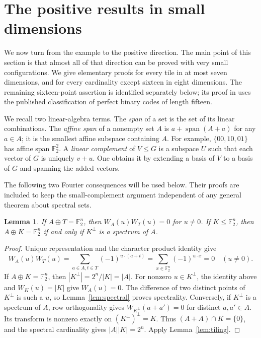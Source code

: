 \documentclass[11pt]{article}
\numberwithin{equation}{section}
\newtheorem{lemma}[theorem]{Lemma}
\theoremstyle{definition}
\theoremstyle{remark}\newtheorem{remark}[theorem]{Remark}
\newcommand{\F}{\mathbb F_2}
\newcommand{\spanof}{\operatorname{span}}
\begin{document}
\section{The positive results in small dimensions}
\label{sec:positive-elementary}

We now turn from the example to the positive direction.  The main point of
this section is that almost all of that direction can be proved with very
small configurations.  We give elementary proofs for every tile in
at most seven dimensions, and for every cardinality except sixteen in
eight dimensions.  The remaining sixteen-point assertion is identified
separately below; its proof in \cite{FI} uses the published classification
of perfect binary codes of length fifteen.

We recall two linear-algebra terms. The \emph{span} of a set is the set
of its linear combinations. The \emph{affine span} of a nonempty set $A$
is $a+\spanof(A+a)$ for any $a\in A$; it is the smallest affine subspace
containing $A$. For example, $\{00,10,01\}$ has affine span $\F^2$.
A \emph{linear complement} of $V\le G$ is a subspace $U$ such that
each vector of $G$ is uniquely $v+u$. One obtains it by extending a basis
of $V$ to a basis of $G$ and spanning the added vectors.

The following two Fourier consequences will be used below. Their proofs
are included to keep the small-complement argument independent of any
general theorem about spectral sets.
\begin{lemma}\label{lem:tilingfourier}
If $A\oplus T=\F^n$, then $W_A(u)W_T(u)=0$ for $u\ne0$.
If $K\le\F^n$, then $A\oplus K=\F^n$ if and only if $K^\perp$
is a spectrum of $A$.
\end{lemma}
\begin{proof}
Unique representation and the character product identity give
\[
 W_A(u)W_T(u)=\sum_{a\in A,t\in T}(-1)^{u\cdot(a+t)}
            =\sum_{x\in\F^n}(-1)^{u\cdot x}=0\quad(u\ne0).
\]
If $A\oplus K=\F^n$, then $|K^\perp|=2^n/|K|=|A|$.
For nonzero $u\in K^\perp$, the identity above and $W_K(u)=|K|$
give $W_A(u)=0$. The difference of two distinct points of $K^\perp$
is such a $u$, so Lemma~\ref{lem:spectral} proves spectrality.
Conversely, if $K^\perp$ is a spectrum of $A$, row orthogonality gives
$W_{K^\perp}(a+a')=0$ for distinct $a,a'\in A$. Its transform is
nonzero exactly on $(K^\perp)^\perp=K$. Thus $(A+A)\cap K=\{0\}$,
and the spectral cardinality gives $|A||K|=2^n$. Apply
Lemma~\ref{lem:tiling}.
\end{proof}
\end{document}
